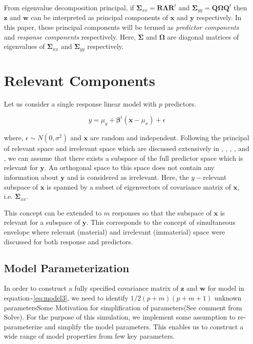 \documentclass[12pt,A4paper,authoryear]{elsarticle} %
\theoremstyle{definition}
\theoremstyle{definition}
\theoremstyle{remark}
\begin{document}
From eigenvalue decomposition principal, if
\(\boldsymbol{\Sigma}_{xx} = \mathbf{R}\boldsymbol{\Lambda}\mathbf{R}^t\)
and
\(\boldsymbol{\Sigma}_{yy} = \mathbf{Q}\boldsymbol{\Omega}\mathbf{Q}^t\)
then \(\mathbf{z}\) and \(\mathbf{w}\) can be interpreted as principal
components of \(\mathbf{x}\) and \(\mathbf{y}\) respectively. In this
paper, these principal components will be termed as \emph{predictor
components} and \emph{response components} respectively. Here,
\(\boldsymbol{\Sigma}\) and \(\boldsymbol{\Omega}\) are diagonal
matrices of eigenvalues of \(\boldsymbol{\Sigma}_{xx}\) and
\(\boldsymbol{\Sigma}_{yy}\) respectively.

\section{Relevant Components}\label{relevant-components}

Let us consider a single response linear model with \(p\) predictors.

\[y = \mu_y + \boldsymbol{\beta}^t\left(\mathbf{x} - \mu_x\right) + \epsilon\]

where, \(\epsilon \sim N(0, \sigma^2)\) and \(\mathbf{x}\) are random
and independent. Following the principal of relevant space and
irrelevant space which are discussed extensively in
\citet{helland1994comparison}, \citet{Helland_2000},
\citet{helland2012near}, \citet{cook2013envelopes},
\citet{saebo2015simrel} and \citet{helland2017}, we can assume that
there exists a subspace of the full predictor space which is relevant
for \(\mathbf{y}\). An orthogonal space to this space does not contain
any information about \(\mathbf{y}\) and is considered as irrelevant.
Here, the \(y-\)relevant subspace of \(\mathbf{x}\) is spanned by a
subset of eigenvectors of covariance matrix of \(\mathbf{x}\), i.e.
\(\boldsymbol{\Sigma}_{xx}\).

This concept can be extended to \(m\) responses so that the subspace of
\(\mathbf{x}\) is relevant for a subspace of \(\mathbf{y}\). This
corresponds to the concept of simultaneous envelope
\citep{cook2015simultaneous} where relevant (material) and irrelevant
(immaterial) space were discussed for both response and predictors.

\subsection{Model Parameterization}\label{model-parameterization}

In order to construct a fully specified covariance matrix of
\(\mathbf{z}\) and \(\mathbf{w}\) for model in
equation\textasciitilde{}\eqref{eq:model3}, we need to identify
\(1/2 (p+m)(p+m+1)\) unknown parameters{\color{red}Some Motivation for
simplification of parameters}({\color{green}See comment from Solve}).
For the purpose of this simulation, we implement some assumption to
re-parameterize and simplify the model parameters. This enables us to
construct a wide range of model properties from few key parameters.
\end{document}
